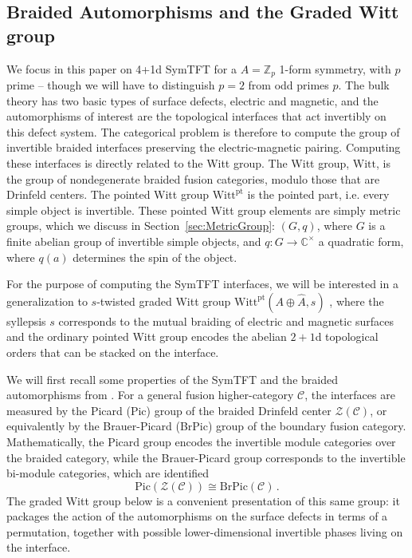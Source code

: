\documentclass[aps,twocolumn,prx,floatfix,preprintnumbers, nofootinbib,10pt]{revtex4-2}
\numberwithin{equation}{section}
\theoremstyle{definition}
\theoremstyle{remark}
\theoremstyle{claim}
\newcommand{\be}{\begin{equation}}
\newcommand{\ee}{\end{equation}}
\newcommand{\Z}{{\mathbb Z}}
\newcommand{\cC}{\mathcal{C}}
\newcommand{\cZ}{\mathcal{Z}}
\newcommand{\Pic}{\text{Pic}}
\newcommand{\BrPic}{\text{BrPic}}
\newcommand{\Witt}{\text{Witt}}
\newcommand{\pt}{\text{pt}}
\begin{document}
\subsection{Braided Automorphisms and the Graded Witt group}

We focus in this paper on 4+1d SymTFT for
a $A=\Z_p$ 1-form symmetry, with $p$ prime -- though we will have to distinguish $p=2$ from odd primes $p$. 
The bulk theory has two basic types of surface
defects, electric and magnetic, and the automorphisms of interest are the
topological interfaces that act invertibly on this defect system.  The
categorical problem is therefore to compute the group of invertible braided
interfaces preserving the electric-magnetic pairing.  
Computing these interfaces is directly related to the Witt group. 
The Witt group, $\Witt$, is the group of nondegenerate braided fusion categories, modulo those that are Drinfeld centers. The pointed Witt group $\Witt^\pt$ is the pointed part, i.e. every simple object is invertible. These pointed Witt group elements are simply metric groups, which we discuss in Section~\ref{sec:MetricGroup}: $(G, q)$, where 
$G$ is a finite abelian group of invertible simple objects,
and $q: G \to \mathbb{C}^\times$ a quadratic form, where $q(a)$ determines  the spin of the object.  

For the purpose of computing the SymTFT interfaces, we will be interested in a generalization to $s$-twisted graded Witt group $\Witt^\pt (A \oplus \widehat{A}, s)$ \cite{Bhardwaj:2024xcx}, where the
syllepsis $s$ corresponds to the mutual braiding of electric and magnetic surfaces and
the ordinary pointed Witt group encodes the {abelian}  $2+1$d topological orders that can be stacked on the interface.

\smallskip


We will first recall some properties of the SymTFT and the braided automorphisms from \cite{Bhardwaj:2024xcx}.
For a general fusion higher-category $\cC$, the 
interfaces are measured by the Picard  (Pic) group of
the braided Drinfeld center $\cZ(\cC)$, or equivalently by the Brauer-Picard (BrPic) group of the boundary
fusion category.  Mathematically, the Picard group encodes the 
invertible module
categories over the braided category, while the Brauer-Picard group corresponds to the  
invertible bi-module categories, which are identified 
\be 
\Pic(\cZ(\cC))\cong\BrPic(\cC)\,.
\ee
The graded Witt group below is a convenient presentation of this same 
group: it packages the action of the automorphisms on the surface defects in terms of
a permutation, together with possible lower-dimensional invertible phases living on the interface.
\end{document}
